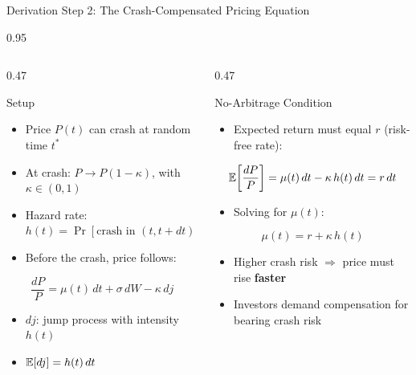 \documentclass[9pt, aspectratio=169, t]{beamer}
\begin{document}
\begin{frame}{Derivation Step 2: The Crash-Compensated Pricing Equation}
    \begin{cminipage}{0.95\textwidth}
    {\footnotesize
    \begin{columns}[T]
        \begin{column}{0.47\textwidth}
            \begin{block}{Setup}
                \begin{itemize}\setlength{\itemsep}{1pt}
                    \item Price $P(t)$ can crash at random time $t^*$
                    \item At crash: $P \to P(1 - \kappa)$, with $\kappa \in (0,1)$
                    \item Hazard rate: $h(t) = \Pr[\text{crash in } (t, t+dt)] / dt$
                    \item Before the crash, price follows:
                \end{itemize}
                \vspace{1mm}
                $$\frac{dP}{P} = \mu(t)\,dt + \sigma\,dW - \kappa\,dj$$
                \begin{itemize}\setlength{\itemsep}{0pt}
                    \item $dj$: jump process with intensity $h(t)$
                    \item $\mathbb{E}[dj] = h(t)\,dt$
                \end{itemize}
            \end{block}
        \end{column}
        \begin{column}{0.47\textwidth}
            \begin{alertblock}{No-Arbitrage Condition}
                \begin{itemize}\setlength{\itemsep}{1pt}
                    \item Expected return must equal $r$ (risk-free rate):
                \end{itemize}
                $$\mathbb{E}\!\left[\frac{dP}{P}\right] = \mu(t)\,dt - \kappa\,h(t)\,dt = r\,dt$$
                \begin{itemize}\setlength{\itemsep}{1pt}
                    \item Solving for $\mu(t)$:
                \end{itemize}
                $$\boxed{\mu(t) = r + \kappa\, h(t)}$$
                \begin{itemize}\setlength{\itemsep}{0pt}
                    \item Higher crash risk $\Rightarrow$ price must rise \textbf{faster}
                    \item Investors demand compensation for bearing crash risk
                \end{itemize}
            \end{alertblock}
        \end{column}
    \end{columns}
    }
    \end{cminipage}
\end{frame}
\end{document}
